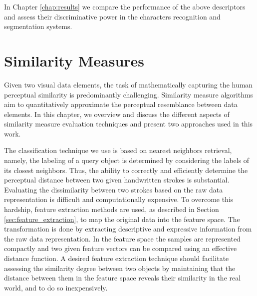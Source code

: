 In Chapter \ref{chap:results} we compare the performance of the above descriptors and assess their discriminative power in the characters recognition and segmentation systems. 

\newpage{}

\section{Similarity Measures}
\label{sec:similarity_measures}

\iftoggle{edit-mode}{\hspace{0pt}\marginpar{Introduction}}{}
Given two visual data elements, the task of mathematically capturing the human perceptual similarity is predominantly challenging. Similarity measure algorithms aim to quantitatively approximate the perceptual resemblance between data elements. In this chapter, we overview and discuss the different aspects of similarity measure evaluation techniques and present two approaches used in this work.

\iftoggle{edit-mode}{\hspace{0pt}\marginpar{Intuition}}{}
The classification technique we use is based on nearest neighbors retrieval, namely, the labeling of a query object is determined by considering the labels of its closest neighbors. Thus, the ability to correctly and efficiently determine the perceptual distance between two given handwritten strokes is  substantial. Evaluating the dissimilarity between two strokes based on the raw data representation is difficult and computationally expensive. To overcome this hardship, feature extraction methods are used, as described in Section \ref{sec:feature_extraction}, to map the original data into the feature space. The transformation is done by extracting descriptive and expressive information from the raw data representation. In the feature space the samples are represented compactly and two given feature vectors can be compared using an effective distance function. A desired feature extraction technique should facilitate assessing the similarity degree between two objects by maintaining that the distance between them in the feature space reveals their similarity in the real world, and to do so inexpensively. 

